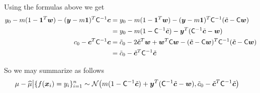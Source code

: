 \documentclass[graybox,footinfo]{svmult}
\begin{document}
Using the formulas above we get
\begin{align*}
y_0 - m(1 - \bsone^T\bsw)  -  (\bsy - m \bsone)^T \mC^{-1} \bsc & = y_0 - m(1 - \bsone^T\bsw)  -  (\bsy - m \bsone)^T \mC^{-1}(\tbsc - \mC \bsw) \\
& = y_0 - m(1 - \mC^{-1}\tbsc) -  \bsy^T (\mC^{-1}\tbsc - \bsw) \\
c_0 - \bsc^T\mC^{-1} \bsc & = \tc_0 -2 \tbsc^T \bsw + \bsw^T \mC \bsw - (\tbsc - \mC \bsw)^T \mC^{-1} (\tbsc - \mC \bsw) \\
& =  \tc_0 - \tbsc ^T \mC^{-1} \tbsc
\end{align*}

So we may summarize as follows
\begin{align*}
\mu - \hmu \big \vert \{f(\bsx_i )= y_i\}_{i=1}^n &\sim \cn \bigl(m(1 - \mC^{-1}\tbsc) +  \bsy^T (\mC^{-1}\tbsc - \bsw), \tc_0 - \tbsc ^T \mC^{-1} \tbsc \bigr)
\end{align*}
\end{document}

